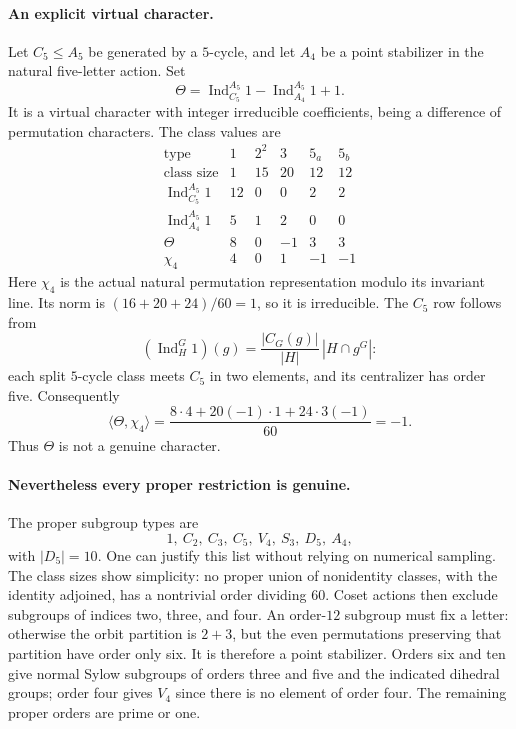 \documentclass[11pt,a4paper]{article}
\numberwithin{equation}{section}
\begin{document}
\paragraph{An explicit virtual character.}
Let $C_5\le A_5$ be generated by a $5$-cycle, and let $A_4$ be a point stabilizer in the natural five-letter action. Set
\begin{equation}\label{r66:theta}
 \Theta=\operatorname{Ind}_{C_5}^{A_5}1-
              \operatorname{Ind}_{A_4}^{A_5}1+1.
\end{equation}
It is a virtual character with integer irreducible coefficients, being a difference of permutation characters. The class values are
\[
\begin{array}{c|rrrrr}
 \text{type}&1&2^2&3&5_a&5_b\\ \hline
 \text{class size}&1&15&20&12&12\\
 \operatorname{Ind}_{C_5}^{A_5}1&12&0&0&2&2\\
 \operatorname{Ind}_{A_4}^{A_5}1&5&1&2&0&0\\
 \Theta&8&0&-1&3&3\\
 \chi_4&4&0&1&-1&-1
\end{array}
\]
Here $\chi_4$ is the actual natural permutation representation modulo its invariant line. Its norm is $(16+20+24)/60=1$, so it is irreducible. The $C_5$ row follows from
\[
 (\operatorname{Ind}_H^G1)(g)
   =\frac{|C_G(g)|}{|H|}\,|H\cap g^G|:
\]
each split $5$-cycle class meets $C_5$ in two elements, and its centralizer has order five. Consequently
\begin{equation}\label{r66:negative}
 \langle\Theta,\chi_4\rangle
   =\frac{8\cdot4+20(-1)\cdot1+24\cdot3(-1)}{60}=-1.
\end{equation}
Thus $\Theta$ is not a genuine character.

\paragraph{Nevertheless every proper restriction is genuine.}
The proper subgroup types are
\[
 1,\ C_2,\ C_3,\ C_5,\ V_4,\ S_3,\ D_5,\ A_4,
\]
with $|D_5|=10$. One can justify this list without relying on numerical sampling. The class sizes show simplicity: no proper union of nonidentity classes, with the identity adjoined, has a nontrivial order dividing $60$. Coset actions then exclude subgroups of indices two, three, and four. An order-$12$ subgroup must fix a letter: otherwise the orbit partition is $2+3$, but the even permutations preserving that partition have order only six. It is therefore a point stabilizer. Orders six and ten give normal Sylow subgroups of orders three and five and the indicated dihedral groups; order four gives $V_4$ since there is no element of order four. The remaining proper orders are prime or one.
\end{document}
